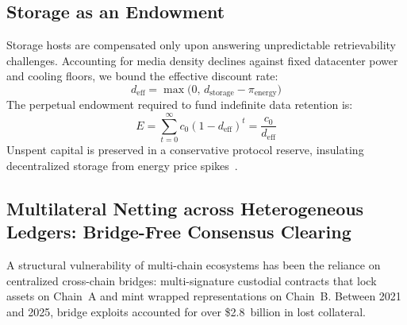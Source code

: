 \documentclass[a4paper,11pt,twoside,parskip=half-,headings=small]{scrartcl}
\begin{document}
\subsection{Storage as an Endowment}
\label{sec:storage}

Storage hosts are compensated only upon answering unpredictable retrievability challenges.
Accounting for media density declines against fixed datacenter power and cooling floors,
we bound the effective discount rate:
\begin{equation}
d_{\text{eff}} = \max\bigl(0,\, d_{\text{storage}} - \pi_{\text{energy}}\bigr)
\end{equation}
The perpetual endowment required to fund indefinite data retention is:
\begin{equation}
E = \sum_{t=0}^{\infty} c_0 (1 - d_{\text{eff}})^t = \frac{c_0}{d_{\text{eff}}}
\end{equation}
Unspent capital is preserved in a conservative protocol reserve, insulating decentralized
storage from energy price spikes~\cite{williams2019arweave}.

\subsection{Multilateral Netting across Heterogeneous Ledgers: Bridge-Free Consensus Clearing}
\label{sec:cross_ledger_netting}

A structural vulnerability of multi-chain ecosystems has been the reliance on centralized cross-chain bridges: multi-signature custodial contracts that lock assets on Chain~A and mint wrapped representations on Chain~B. Between 2021 and 2025, bridge exploits accounted for over \$2.8~billion in lost collateral.
\end{document}
